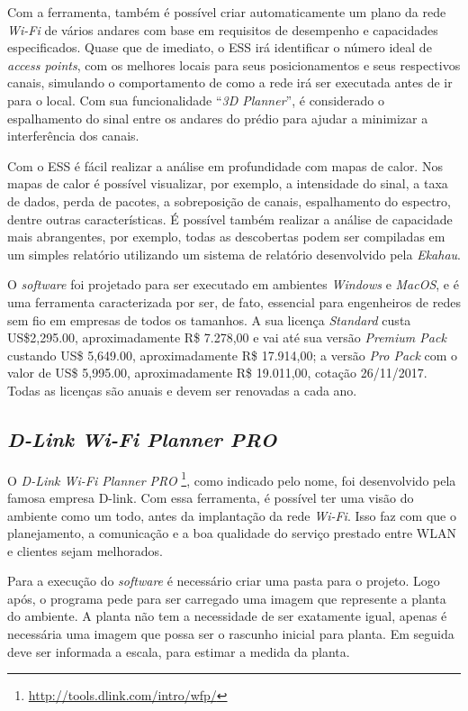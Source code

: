 \documentclass[
	12pt,				%
	twoside,			%
	a4paper,			%
	english,			%
	french,				%
	spanish,			%
	brazil				%
	]{abntex2}
\begin{document}
Com a ferramenta, também é possível criar automaticamente um plano da
rede \emph{Wi-Fi} de vários andares com base em requisitos de desempenho
e capacidades especificados. Quase que de imediato, o ESS irá
identificar o número ideal de \emph{access points}, com os melhores
locais para seus posicionamentos e seus respectivos canais, simulando o
comportamento de como a rede irá ser executada antes de ir para o local.
Com sua funcionalidade ``\emph{3D Planner}'', é considerado o
espalhamento do sinal entre os andares do prédio para ajudar a minimizar
a interferência dos canais.

Com o ESS é fácil realizar a análise em profundidade com mapas de calor.
Nos mapas de calor é possível visualizar, por exemplo, a intensidade do
sinal, a taxa de dados, perda de pacotes, a sobreposição de canais,
espalhamento do espectro, dentre outras características. É possível
também realizar a análise de capacidade mais abrangentes, por exemplo,
todas as descobertas podem ser compiladas em um simples relatório
utilizando um sistema de relatório desenvolvido pela \emph{Ekahau}.

O \emph{software} foi projetado para ser executado em ambientes
\emph{Windows} e \emph{MacOS}, e é uma ferramenta caracterizada por ser,
de fato, essencial para engenheiros de redes sem fio em empresas de
todos os tamanhos. A sua licença \emph{Standard} custa US\$2,295.00,
aproximadamente R\$ 7.278,00 e vai até sua versão \emph{Premium Pack}
custando US\$ 5,649.00, aproximadamente R\$ 17.914,00; a versão
\emph{Pro Pack} com o valor de US\$ 5,995.00, aproximadamente R\$
19.011,00, cotação 26/11/2017. Todas as licenças são anuais e devem ser
renovadas a cada ano.

\subsection{\texorpdfstring{\emph{D-Link Wi-Fi Planner
PRO}}{D-Link Wi-Fi Planner PRO}}\label{d-link-wi-fi-planner-pro}

O \emph{D-Link Wi-Fi Planner PRO} \footnote{\url{http://tools.dlink.com/intro/wfp/}},
como indicado pelo nome, foi desenvolvido pela famosa empresa D-link.
Com essa ferramenta, é possível ter uma visão do ambiente como um todo,
antes da implantação da rede \emph{Wi-Fi}. Isso faz com que o
planejamento, a comunicação e a boa qualidade do serviço prestado entre
WLAN e clientes sejam melhorados.

Para a execução do \emph{software} é necessário criar uma pasta para o
projeto. Logo após, o programa pede para ser carregado uma imagem que
represente a planta do ambiente. A planta não tem a necessidade de ser
exatamente igual, apenas é necessária uma imagem que possa ser o
rascunho inicial para planta. Em seguida deve ser informada a escala,
para estimar a medida da planta.
\end{document}
